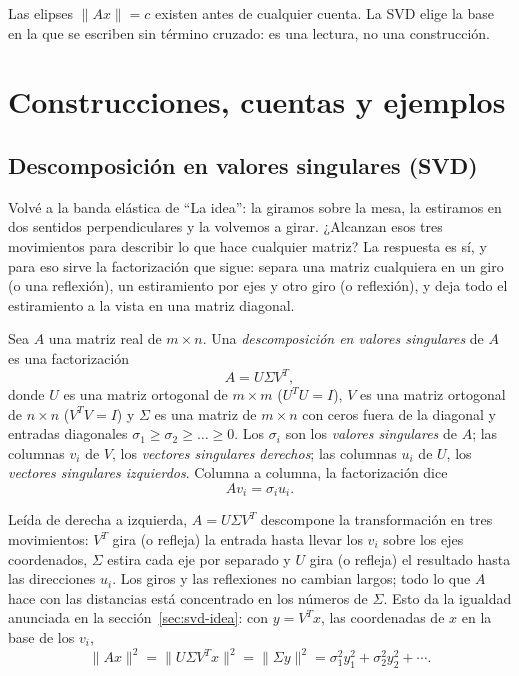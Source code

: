 \begin{idea}
Las elipses \(\|Ax\|=c\) existen antes de cualquier cuenta. La SVD elige la base en la que se
escriben sin término cruzado: es una lectura, no una construcción.
\end{idea}

\section{Construcciones, cuentas y ejemplos}

\subsection{Descomposición en valores singulares (SVD)}\label{sec:svd}

Volvé a la banda elástica de \enquote{La idea}: la giramos sobre la mesa, la estiramos en dos sentidos
perpendiculares y la volvemos a girar.
¿Alcanzan esos tres movimientos para describir lo que hace cualquier matriz?
La respuesta es sí, y para eso sirve la factorización que sigue: separa una matriz cualquiera en
un giro (o una reflexión), un estiramiento por ejes y otro giro (o reflexión), y deja todo el estiramiento a la vista en una
matriz diagonal.

\begin{definicion}
Sea \(A\) una matriz real de \(m\times n\). Una \emph{descomposición en valores singulares}
de \(A\) es una factorización
\[
  A=U\Sigma V^T ,
\]
donde \(U\) es una matriz ortogonal de \(m\times m\) (\(U^TU=I\)), \(V\) es una matriz
ortogonal de \(n\times n\) (\(V^TV=I\)) y \(\Sigma\) es una matriz de \(m\times n\) con
ceros fuera de la diagonal y entradas diagonales \(\sigma_1\ge\sigma_2\ge\dots\ge0\). Los
\(\sigma_i\) son los \emph{valores singulares} de \(A\); las columnas \(v_i\) de \(V\), los
\emph{vectores singulares derechos}; las columnas \(u_i\) de \(U\), los \emph{vectores
singulares izquierdos}. Columna a columna, la factorización dice
\[
  Av_i=\sigma_i u_i .
\]
\end{definicion}

Leída de derecha a izquierda, \(A=U\Sigma V^T\) descompone la transformación en tres
movimientos: \(V^T\) gira (o refleja) la entrada hasta llevar los \(v_i\) sobre los ejes
coordenados, \(\Sigma\) estira cada eje por separado y \(U\) gira (o refleja) el resultado
hasta las direcciones \(u_i\). Los giros y las reflexiones no cambian largos; todo lo que
\(A\) hace con las distancias está concentrado en los números de \(\Sigma\). Esto da la
igualdad anunciada en la sección~\ref{sec:svd-idea}: con \(y=V^Tx\), las coordenadas de \(x\)
en la base de los \(v_i\),
\[
  \|Ax\|^2=\|U\Sigma V^Tx\|^2=\|\Sigma y\|^2=\sigma_1^2y_1^2+\sigma_2^2y_2^2+\cdots .
\]

